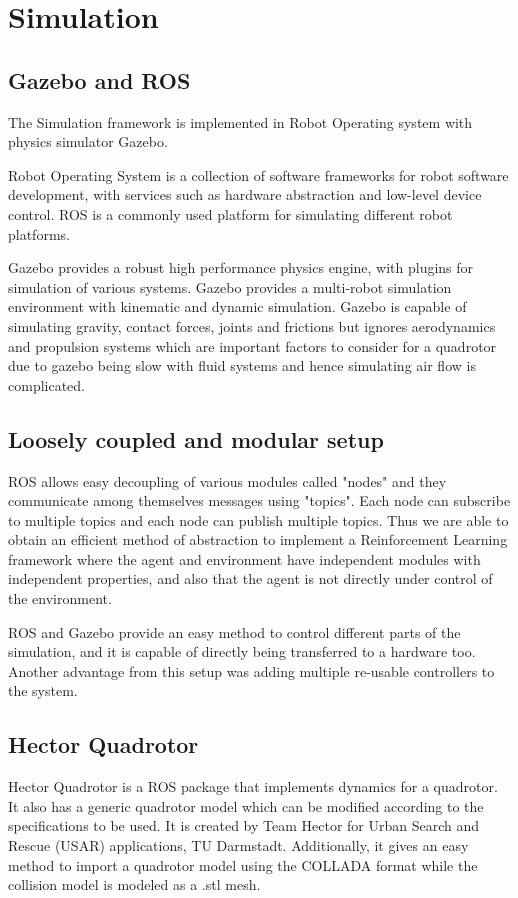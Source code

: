 \documentclass[hidelinks,BTech]{iitmdiss}
\begin{document}

\chapter{Simulation}

\section{Gazebo and ROS}
The Simulation framework is implemented in Robot Operating system \cite{ROS} with physics simulator Gazebo\cite{Gazebo}. 

Robot Operating System is a collection of software frameworks for robot software development, with services such as hardware abstraction and low-level device control. ROS is a commonly used platform for simulating different robot platforms.

Gazebo provides a robust high performance physics engine, with plugins for simulation of various systems. Gazebo provides a multi-robot simulation environment with kinematic and dynamic simulation. Gazebo is capable of simulating gravity, contact forces, joints and frictions but ignores aerodynamics and propulsion systems which are important factors to consider for a quadrotor due to gazebo being slow with fluid systems and hence simulating air flow is complicated.

\section{Loosely coupled and modular setup}
ROS allows easy decoupling of various modules called "nodes" and they communicate among themselves messages using "topics". Each node can subscribe to multiple topics and each node can publish multiple topics. Thus we are able to obtain an efficient method of abstraction to implement a Reinforcement Learning framework where the agent and environment have independent modules with independent properties, and also that the agent is not directly under control of the environment.

ROS and Gazebo provide an easy method to control different parts of the simulation, and it is capable of directly being transferred to a hardware too. Another advantage from this setup was adding multiple re-usable controllers to the system.

\section{Hector Quadrotor}
Hector Quadrotor \cite{HectorQuadrotor} is a ROS package that implements dynamics for a quadrotor. It also has a generic quadrotor model which can be modified according to the specifications to be used. It is created by Team Hector for Urban Search and Rescue (USAR) applications, TU Darmstadt. Additionally, it gives an easy method to import a quadrotor model using the COLLADA format while the collision model is modeled as a .stl mesh.
\end{document}
